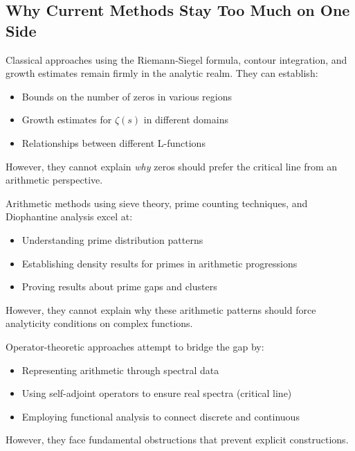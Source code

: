 \subsection{Why Current Methods Stay Too Much on One Side}
\label{subsec:one_sided_methods}

\begin{example}
Classical approaches using the Riemann-Siegel formula, contour integration, and growth estimates remain firmly in the analytic realm. They can establish:
\begin{itemize}
\item Bounds on the number of zeros in various regions
\item Growth estimates for $\zeta(s)$ in different domains
\item Relationships between different L-functions
\end{itemize}
However, they cannot explain \emph{why} zeros should prefer the critical line from an arithmetic perspective.
\end{example}

\begin{example}
Arithmetic methods using sieve theory, prime counting techniques, and Diophantine analysis excel at:
\begin{itemize}
\item Understanding prime distribution patterns
\item Establishing density results for primes in arithmetic progressions
\item Proving results about prime gaps and clusters
\end{itemize}
However, they cannot explain why these arithmetic patterns should force analyticity conditions on complex functions.
\end{example}

\begin{example}
Operator-theoretic approaches attempt to bridge the gap by:
\begin{itemize}
\item Representing arithmetic through spectral data
\item Using self-adjoint operators to ensure real spectra (critical line)
\item Employing functional analysis to connect discrete and continuous
\end{itemize}
However, they face fundamental obstructions that prevent explicit constructions.
\end{example}

